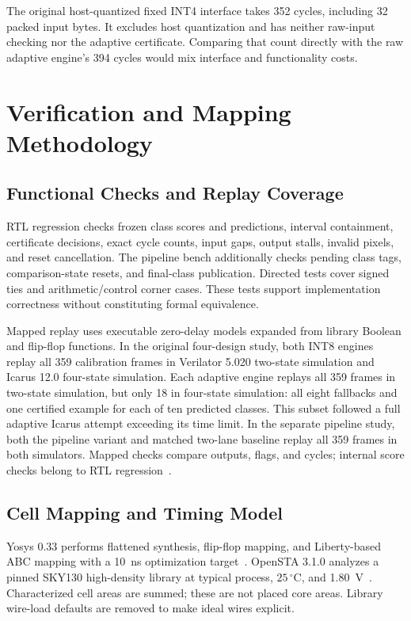 The original host-quantized fixed INT4 interface takes 352 cycles, including 32 packed input bytes. It excludes host quantization and has neither raw-input checking nor the adaptive certificate. Comparing that count directly with the raw adaptive engine's 394 cycles would mix interface and functionality costs.

\section{Verification and Mapping Methodology}
\subsection{Functional Checks and Replay Coverage}
RTL regression checks frozen class scores and predictions, interval containment, certificate decisions, exact cycle counts, input gaps, output stalls, invalid pixels, and reset cancellation. The pipeline bench additionally checks pending class tags, comparison-state resets, and final-class publication. Directed tests cover signed ties and arithmetic/control corner cases. These tests support implementation correctness without constituting formal equivalence.

Mapped replay uses executable zero-delay models expanded from library Boolean and flip-flop functions. In the original four-design study, both INT8 engines replay all 359 calibration frames in Verilator 5.020 two-state simulation and Icarus 12.0 four-state simulation. Each adaptive engine replays all 359 frames in two-state simulation, but only 18 in four-state simulation: all eight fallbacks and one certified example for each of ten predicted classes. This subset followed a full adaptive Icarus attempt exceeding its time limit. In the separate pipeline study, both the pipeline variant and matched two-lane baseline replay all 359 frames in both simulators. Mapped checks compare outputs, flags, and cycles; internal score checks belong to RTL regression~\cite{flexmac}.

\subsection{Cell Mapping and Timing Model}
Yosys 0.33 performs flattened synthesis, flip-flop mapping, and Liberty-based ABC mapping with a 10~ns optimization target~\cite{yosys}. OpenSTA 3.1.0 analyzes a pinned SKY130 high-density library at typical process, $25\,^{\circ}$C, and 1.80~V~\cite{opensta,sky130}. Characterized cell areas are summed; these are not placed core areas. Library wire-load defaults are removed to make ideal wires explicit.

